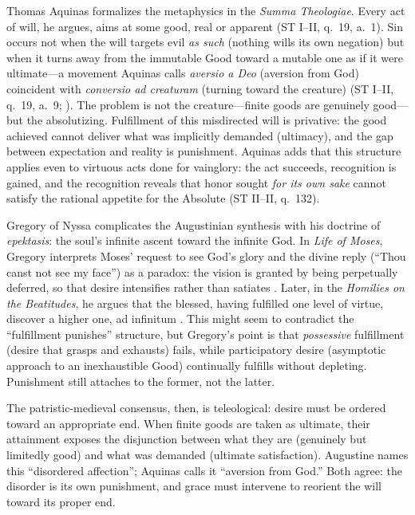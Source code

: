 Thomas Aquinas formalizes the metaphysics in the \emph{Summa Theologiae}. Every act of will,
he argues, aims at some good, real or apparent (ST I--II, q.~19, a.~1). Sin occurs not when
the will targets evil \emph{as such} (nothing wills its own negation) but when it turns away
from the immutable Good toward a mutable one as if it were ultimate---a movement Aquinas calls
\emph{aversio a Deo} (aversion from God) coincident with \emph{conversio ad creaturam}
(turning toward the creature) (ST I--II, q.~19, a.~9; ). The
problem is not the creature---finite goods are genuinely good---but the absolutizing.
Fulfillment of this misdirected will is privative: the good achieved cannot deliver what was
implicitly demanded (ultimacy), and the gap between expectation and reality is punishment.
Aquinas adds that this structure applies even to virtuous acts done for vainglory: the act
succeeds, recognition is gained, and the recognition reveals that honor sought \emph{for its
	own sake} cannot satisfy the rational appetite for the Absolute (ST II--II, q.~132).

Gregory of Nyssa complicates the Augustinian synthesis with his doctrine of \emph{epektasis}:
the soul's infinite ascent toward the infinite God. In \emph{Life of Moses}, Gregory interprets
Moses' request to see God's glory and the divine reply (``Thou canst not see my face'') as a
paradox: the vision is granted by being perpetually deferred, so that desire intensifies
rather than satiates . Later, in the \emph{Homilies on the
	Beatitudes}, he argues that the blessed, having fulfilled one level of virtue, discover a
higher one, ad infinitum . This might seem to
contradict the ``fulfillment punishes'' structure, but Gregory's point is that
\emph{possessive} fulfillment (desire that grasps and exhausts) fails, while participatory
desire (asymptotic approach to an inexhaustible Good) continually fulfills without depleting.
Punishment still attaches to the former, not the latter.

The patristic-medieval consensus, then, is teleological: desire must be ordered toward an
appropriate end. When finite goods are taken as ultimate, their attainment exposes the
disjunction between what they are (genuinely but limitedly good) and what was demanded
(ultimate satisfaction). Augustine names this ``disordered affection''; Aquinas calls it
``aversion from God.'' Both agree: the disorder is its own punishment, and grace must
intervene to reorient the will toward its proper end.
